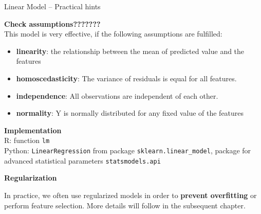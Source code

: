 \documentclass[11pt,compress,t,notes=noshow, xcolor=table]{beamer}
\newcommand{\highlight}[1]{\textcolor{highlightcol}{\textbf{#1}}}
\let\code=\texttt
\begin{document}
\begin{frame}{Linear Model -- Practical hints}

\footnotesize

 \highlight{Check assumptions???????} \\
 This model is very effective, if the following assumptions are fulfilled:
 \begin{itemize}\footnotesize
  \item \textbf{linearity}: the relationship between the mean of predicted value and the features
  \item \textbf{homoscedasticity}: The variance of residuals is equal for all features.
  \item \textbf{independence}: All observations are independent of each other.
  \item \textbf{normality}: Y is normally distributed for any fixed value of the features
\end{itemize}

\lz

  \highlight{Implementation} \\
  \smallskip
  R: function \code{lm}\\
  Python: \code{LinearRegression} from package \code{sklearn.linear\_model}, package for advanced statistical parameters \code{statsmodels.api} 

\lz

 \highlight{Regularization} \\
 \smallskip
 
 In practice, we often use regularized models in order to \textbf{prevent overfitting} or perform feature selection. More details will follow in the subsequent chapter. 


\end{frame}

\end{document}
